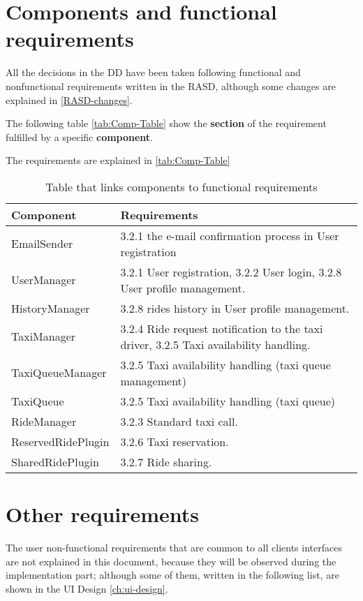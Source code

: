 \section{Components and functional requirements}
All the decisions in the DD have been taken following functional and nonfunctional requirements written in the RASD, although some changes are explained in \autoref{RASD-changes}.

The following table \autoref{tab:Comp-Table} show the {\bf section} of the requirement fulfilled by a specific {\bf component}. 

The requirements are explained in \autoref{tab:Comp-Table}
\begin{table}[h]
\begin{center}
\begin{tabular}{|p{}|p{}|}
\hline
{\bf Component}  & {\bf Requirements}\\
\hline
EmailSender & 3.2.1 the e-mail confirmation process in User registration \\
\hline
UserManager & 3.2.1 User registration, 3.2.2 User login, 3.2.8 User profile management.\\
\hline
HistoryManager & 3.2.8 rides history in User profile management.\\
\hline
TaxiManager & 3.2.4 Ride request notification to the taxi driver, 3.2.5 Taxi availability handling.\\
\hline
TaxiQueueManager & 3.2.5 Taxi availability handling (taxi queue management) \\
\hline
TaxiQueue & 3.2.5 Taxi availability handling (taxi queue)\\
\hline
RideManager & 3.2.3 Standard taxi call.\\
\hline 
ReservedRidePlugin & 3.2.6 Taxi reservation.\\
\hline
SharedRidePlugin & 3.2.7 Ride sharing.\\
\hline
\end{tabular}
\caption{Table that links components to functional requirements}
\label{tab:Comp-Table}
\end{center}
\end{table}

\section{Other requirements}


The user non-functional requirements that are common to all clients interfaces are not explained in this document, because they will be observed during the implementation part; although some of them, written in the following list, are shown in the UI Design \autoref{ch:ui-design}.

